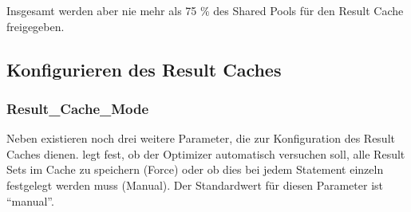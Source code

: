         Insgesamt werden aber nie mehr als 75 \% des Shared Pools für den Result Cache freigegeben.
      \subsection{Konfigurieren des Result Caches}
        \subsubsection{Result\_Cache\_Mode}
          Neben  existieren noch drei weitere Parameter, die zur Konfiguration des Result Caches dienen.  legt fest, ob der Optimizer automatisch versuchen soll, alle Result Sets im Cache zu speichern (Force) oder ob dies bei jedem Statement einzeln festgelegt werden muss (Manual). Der Standardwert für diesen Parameter ist \enquote{manual}.

